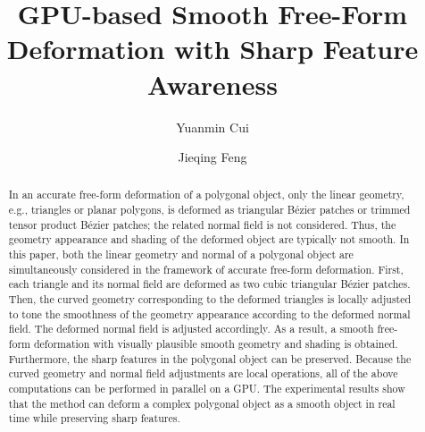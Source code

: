 \documentclass[3p]{elsarticle}
\begin{document}
\begin{frontmatter}

\title{GPU-based Smooth Free-Form Deformation with Sharp Feature Awareness}





\author{Yuanmin Cui}

\author{Jieqing Feng}

\address{State Key Lab of CAD\&CG, Zhejiang University, China}

\begin{abstract}
In an accurate free-form deformation of a polygonal object, only the linear geometry, e.g., triangles or planar
polygons, is deformed as triangular B\'ezier patches or trimmed tensor product B\'ezier patches; the related normal
field is not considered. Thus, the geometry appearance and shading of the deformed object are typically not smooth. In
this paper, both the linear geometry and normal of a polygonal object are simultaneously considered in the framework of
accurate free-form deformation. First, each triangle and its normal field are deformed as two cubic triangular B\'ezier
patches. Then, the curved geometry corresponding to the deformed triangles is locally adjusted to tone the smoothness of
the geometry appearance according to the deformed normal field. The deformed normal field is adjusted accordingly. As a
result, a smooth free-form deformation with visually plausible smooth geometry and shading is obtained. Furthermore,
the sharp features in the polygonal object can be preserved. Because the curved geometry and normal field adjustments
are local operations, all of the above computations can be performed in parallel on a GPU. The experimental results
show that the method can deform a complex polygonal object as a smooth object in real time while preserving sharp
features.
\end{abstract}


\end{frontmatter}
\end{document}
